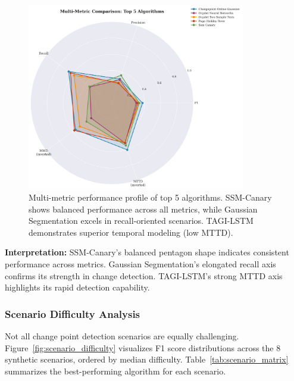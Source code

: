 \begin{table}[H]
\begin{figure}[htbp]
\centering
\includegraphics[width=0.85\textwidth]{figures/fig_radar_metrics.png}
\caption{Multi-metric performance profile of top 5 algorithms. SSM-Canary shows balanced performance across all metrics, while Gaussian Segmentation excels in recall-oriented scenarios. TAGI-LSTM demonstrates superior temporal modeling (low MTTD).}
\label{fig:radar_metrics}
\end{figure}

\textbf{Interpretation:} SSM-Canary's balanced pentagon shape indicates consistent performance across metrics. Gaussian Segmentation's elongated recall axis confirms its strength in change detection. TAGI-LSTM's strong MTTD axis highlights its rapid detection capability.


\subsubsection{Scenario Difficulty Analysis}

Not all change point detection scenarios are equally challenging. Figure~\ref{fig:scenario_difficulty} visualizes F1 score distributions across the 8 synthetic scenarios, ordered by median difficulty. Table~\ref{tab:scenario_matrix} summarizes the best-performing algorithm for each scenario.


\end{table}
